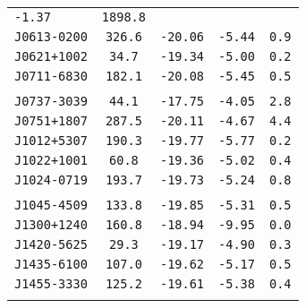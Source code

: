 \begin{longtable}{ l | c | c | c | c }
\scriptsize{\tt{-1.37}} & \scriptsize{\tt{1898.8}} \\[-16pt]
\scriptsize{\tt{J0613-0200}} & \scriptsize{\tt{326.6}} & \scriptsize{\tt{-20.06}} &
\scriptsize{\tt{-5.44}} & \scriptsize{\tt{0.9}} \\[-16pt]
\scriptsize{\tt{J0621+1002}} & \scriptsize{\tt{34.7}} & \scriptsize{\tt{-19.34}} &
\scriptsize{\tt{-5.00}} & \scriptsize{\tt{0.2}} \\[-16pt]
\scriptsize{\tt{J0711-6830}} & \scriptsize{\tt{182.1}} & \scriptsize{\tt{-20.08}} &
\scriptsize{\tt{-5.45}} & \scriptsize{\tt{0.5}} \\[-16pt]
\\[-20pt]
\scriptsize{\tt{J0737-3039}} & \scriptsize{\tt{44.1}} & \scriptsize{\tt{-17.75}} &
\scriptsize{\tt{-4.05}} & \scriptsize{\tt{2.8}} \\[-16pt]
\scriptsize{\tt{J0751+1807}} & \scriptsize{\tt{287.5}} & \scriptsize{\tt{-20.11}} &
\scriptsize{\tt{-4.67}} & \scriptsize{\tt{4.4}} \\[-16pt]
\scriptsize{\tt{J1012+5307}} & \scriptsize{\tt{190.3}} & \scriptsize{\tt{-19.77}} &
\scriptsize{\tt{-5.77}} & \scriptsize{\tt{0.2}} \\[-16pt]
\scriptsize{\tt{J1022+1001}} & \scriptsize{\tt{60.8}} & \scriptsize{\tt{-19.36}} &
\scriptsize{\tt{-5.02}} & \scriptsize{\tt{0.4}} \\[-16pt]
\scriptsize{\tt{J1024-0719}} & \scriptsize{\tt{193.7}} & \scriptsize{\tt{-19.73}} &
\scriptsize{\tt{-5.24}} & \scriptsize{\tt{0.8}} \\[-16pt]
\\[-20pt]
\scriptsize{\tt{J1045-4509}} & \scriptsize{\tt{133.8}} & \scriptsize{\tt{-19.85}} &
\scriptsize{\tt{-5.31}} & \scriptsize{\tt{0.5}} \\[-16pt]
\scriptsize{\tt{J1300+1240}} & \scriptsize{\tt{160.8}} & \scriptsize{\tt{-18.94}} &
\scriptsize{\tt{-9.95}} & \scriptsize{\tt{0.0}} \\[-16pt]
\scriptsize{\tt{J1420-5625}} & \scriptsize{\tt{29.3}} & \scriptsize{\tt{-19.17}} &
\scriptsize{\tt{-4.90}} & \scriptsize{\tt{0.3}} \\[-16pt]
\scriptsize{\tt{J1435-6100}} & \scriptsize{\tt{107.0}} & \scriptsize{\tt{-19.62}} &
\scriptsize{\tt{-5.17}} & \scriptsize{\tt{0.5}} \\[-16pt]
\scriptsize{\tt{J1455-3330}} & \scriptsize{\tt{125.2}} & \scriptsize{\tt{-19.61}} &
\scriptsize{\tt{-5.38}} & \scriptsize{\tt{0.4}} \\[-16pt]
\\[-20pt] 

\end{longtable}
